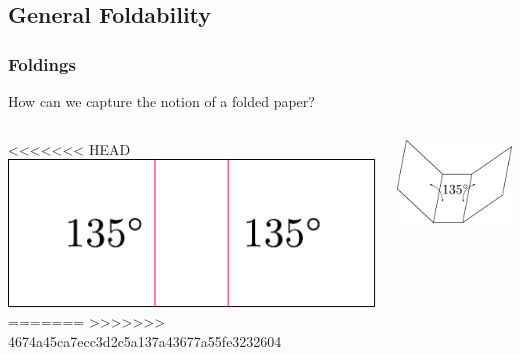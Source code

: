 \documentclass{beamer}
\begin{document}
\subsection{General Foldability}

\begin{frame}
\frametitle{Foldings}

\begin{block}{}
How can we capture the notion of a folded paper? 
\end{block}

\pause
\begin{columns}[c]
<<<<<<< HEAD
\includegraphics[width=\textwidth]{knot_pix/unfolded.pdf}
=======
>>>>>>> 4674a45ca7ecc3d2c5a137a43677a55fe3232604

\pause
{}
\includegraphics[width=\textwidth]{knot_pix/folded-valid.pdf}
\end{columns}
\end{frame}
\end{document}
